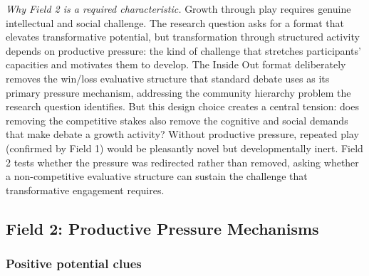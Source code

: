 \documentclass[12pt]{article}
\begin{document}
\noindent\textit{Why Field 2 is a required characteristic.} Growth through play requires genuine intellectual and social challenge. The research question asks for a format that elevates transformative potential, but transformation through structured activity depends on productive pressure: the kind of challenge that stretches participants' capacities and motivates them to develop. The Inside Out format deliberately removes the win/loss evaluative structure that standard debate uses as its primary pressure mechanism, addressing the community hierarchy problem the research question identifies. But this design choice creates a central tension: does removing the competitive stakes also remove the cognitive and social demands that make debate a growth activity? Without productive pressure, repeated play (confirmed by Field 1) would be pleasantly novel but developmentally inert. Field 2 tests whether the pressure was redirected rather than removed, asking whether a non-competitive evaluative structure can sustain the challenge that transformative engagement requires.

\bigskip

\subsection*{Field 2: Productive Pressure Mechanisms}

\subsubsection*{Positive potential clues}
\end{document}
